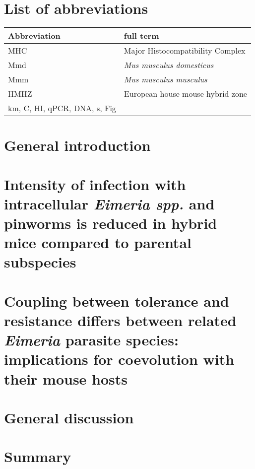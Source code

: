 \documentclass[11pt]{report}
\numberwithin{equation}{section} %
\begin{document}

\clearpage

\clearpage


\tableofcontents

\chapter*{List of abbreviations}
\begin{tabular}{l l}
Abbreviation & full term \\
\hline
MHC & Major Histocompatibility Complex \\
Mmd & \textit{Mus musculus domesticus} \\
Mmm    & \textit{Mus musculus musculus}  \\
HMHZ   & European house mouse hybrid zone \\
km, C, HI, qPCR, DNA, s, Fig

\end{tabular}

\chapter{General introduction}

 
\chapter{Intensity of infection with intracellular \textit{Eimeria spp.} and pinworms is reduced in hybrid mice compared to parental subspecies}


\chapter{Coupling between tolerance and resistance differs between related \textit{Eimeria} parasite species: implications for coevolution with their mouse hosts}


\chapter{General discussion}


\chapter*{Summary}

\end{document}
